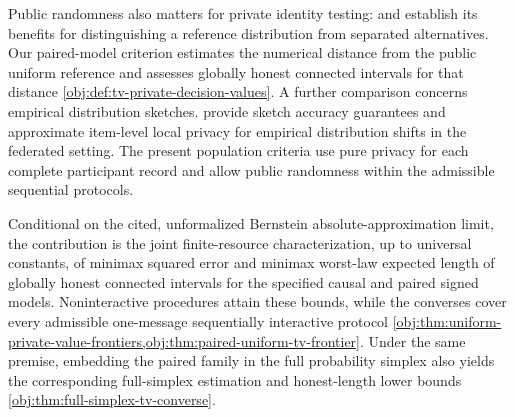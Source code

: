 Public randomness also matters for private identity testing: \citet{AcharyaCanonneFreitagTyagi2019TestWithoutTrust} and \citet{Acharya2021} establish its benefits for distinguishing a reference distribution from separated alternatives. Our paired-model criterion estimates the numerical distance from the public uniform reference and assesses globally honest connected intervals for that distance \cref{obj:def:tv-private-decision-values}. A further comparison concerns empirical distribution sketches. \citet[Theorems~4.6, 4.10, and~4.13]{CormodeTing2025FederatedShift} provide sketch accuracy guarantees and approximate item-level local privacy for empirical distribution shifts in the federated setting. The present population criteria use pure privacy for each complete participant record and allow public randomness within the admissible sequential protocols.

Conditional on the cited, unformalized Bernstein absolute-approximation limit, the contribution is the joint finite-resource characterization, up to universal constants, of minimax squared error and minimax worst-law expected length of globally honest connected intervals for the specified causal and paired signed models. Noninteractive procedures attain these bounds, while the converses cover every admissible one-message sequentially interactive protocol \cref{obj:thm:uniform-private-value-frontiers,obj:thm:paired-uniform-tv-frontier}. Under the same premise, embedding the paired family in the full probability simplex also yields the corresponding full-simplex estimation and honest-length lower bounds \cref{obj:thm:full-simplex-tv-converse}.
